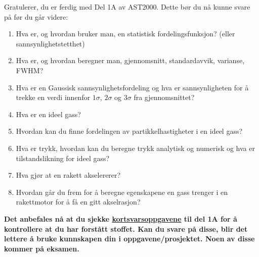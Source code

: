 \documentclass{beamer}
\let\hrefori\href
\renewcommand{\href}[2]{{\setlength{\fboxsep}{1pt}\colorbox{sunset}{\hrefori{#1}{#2}}}}
\newcommand{\pagebutton}[1]{\setbeamertemplate{button}{\tikz\node[inner xsep = 5pt, draw = structure!90, fill = green(ryb), rounded corners = 8pt]{\color{amber}\Large\insertbuttontext};}\beamerbutton{#1}}
\begin{document}
\begin{frame}
{\hyperlink{sammendrag}{\pagebutton{\bf SIDE 32/32/32}}
{\scriptsize
Gratulerer, du er ferdig med Del 1A av AST2000. Dette bør du nå kunne svare på før du går videre:
\begin{enumerate}
\item Hva er, og hvordan bruker man, en statistisk fordelingsfunksjon? (eller sannsynlighetstetthet)
\item Hva er, og hvordan beregner man, gjennomsnitt, standardavvik, varianse, FWHM?
\item Hva er en Gaussisk sannsynlighetsfordeling og hva er sannsynligheten for å trekke en verdi innenfor $1\sigma$, $2\sigma$ og $3\sigma$ fra gjennomsnittet?
\item Hva er en ideel gass?
\item Hvordan kan du finne fordelingen av partikkelhastigheter i en ideel gass?
\item Hva er trykk, hvordan kan du beregne trykk analytisk og numerisk og hva er tilstandslikning for ideel gass?
\item Hva gjør at en rakett akselererer?
\item Hvordan går du frem for å beregne egenskapene en gass trenger i en rakettmotor for å få en gitt akselrasjon?
\end{enumerate}
    {\bf Det anbefales nå at du sjekke \href{https://www.uio.no/studier/emner/matnat/astro/AST2000/h21/undervisningsmateriell/kortsvarsoppgaver/del1a.pdf}{kortsvarsoppgavene} til del 1A for å kontrollere at du har forstått stoffet. Kan du svare på disse, blir det lettere å bruke kunnskapen din i oppgavene/prosjektet. Noen av disse kommer på eksamen.}
    }
}

\end{frame}
\end{document}
